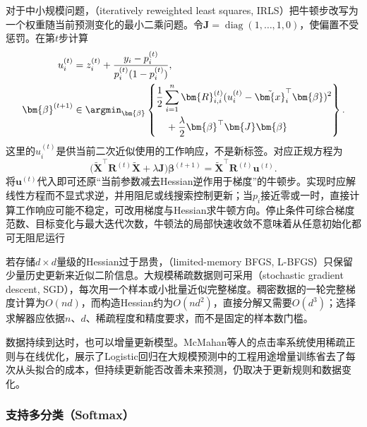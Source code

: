 对于中小规模问题，（iteratively reweighted least squares, IRLS）把牛顿步改写为一个权重随当前预测变化的最小二乘问题。令$\bm{J}=\operatorname{diag}(1,\ldots,1,0)$，使偏置不受惩罚。在第$t$步计算
\begin{equation}
  \label{eq:classification-logistic-irls}
  \begin{aligned}
    u_i^{(t)}
      &=z_i^{(t)}
        +\frac{y_i-p_i^{(t)}}{p_i^{(t)}(1-p_i^{(t)})},\\
    \bm{\beta}^{(t+1)}
      &\in\argmin_{\bm{\beta}}\left\{
        \begin{aligned}
          &\frac12\sum_{i=1}^{n}\bm{R}_{i,i}^{(t)}
            (u_i^{(t)}-\tilde{\bm{x}}_i^{\top}\bm{\beta})^2\\
          &\quad{}+\frac{\lambda}{2}
            \bm{\beta}^{\top}\bm{J}\bm{\beta}
        \end{aligned}
      \right\}.
  \end{aligned}
\end{equation}
这里的$u_i^{(t)}$是供当前二次近似使用的工作响应，不是新标签。对应正规方程为
\[
  \bigl(\tilde{\bm{X}}^{\top}\bm{R}^{(t)}\tilde{\bm{X}}
       +\lambda\bm{J}\bigr)\bm{\beta}^{(t+1)}
  =\tilde{\bm{X}}^{\top}\bm{R}^{(t)}\bm{u}^{(t)}.
\]
将$\bm{u}^{(t)}$代入即可还原“当前参数减去Hessian逆作用于梯度”的牛顿步。实现时应解线性方程而不显式求逆，并用阻尼或线搜索控制更新；当$p_i$接近零或一时，直接计算工作响应可能不稳定，可改用梯度与Hessian求牛顿方向。停止条件可综合梯度范数、目标变化与最大迭代次数，牛顿法的局部快速收敛不意味着从任意初始化都可无阻尼运行

若存储$d\times d$量级的Hessian过于昂贵，（limited-memory BFGS, L-BFGS）只保留少量历史更新来近似二阶信息。大规模稀疏数据则可采用（stochastic gradient descent, SGD），每次用一个样本或小批量近似完整梯度。稠密数据的一轮完整梯度计算为$O(nd)$，而构造Hessian约为$O(nd^2)$，直接分解又需要$O(d^3)$；选择求解器应依据$n$、$d$、稀疏程度和精度要求，而不是固定的样本数门槛。

数据持续到达时，也可以增量更新模型。McMahan等人的点击率系统使用稀疏正则与在线优化，展示了Logistic回归在大规模预测中的工程用途增量训练省去了每次从头拟合的成本，但持续更新能否改善未来预测，仍取决于更新规则和数据变化。

\subsubsection{支持多分类（Softmax）}
\label{sec:classification-logistic-softmax}


